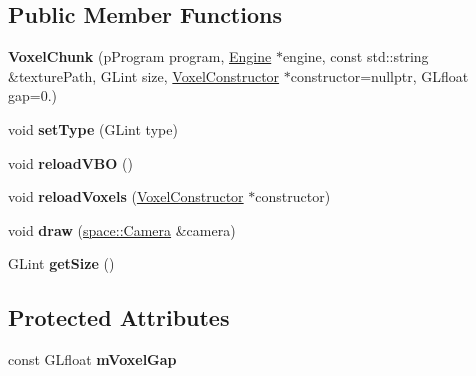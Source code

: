 \subsection*{Public Member Functions}
\begin{DoxyCompactItemize}
\item 
\hypertarget{classfillwave_1_1terrain_1_1VoxelChunk_a88e4008a5cc1f762ec84ed581928c489}{}{\bfseries Voxel\+Chunk} (p\+Program program, \hyperlink{classfillwave_1_1Engine}{Engine} $\ast$engine, const std\+::string \&texture\+Path, G\+Lint size, \hyperlink{classfillwave_1_1terrain_1_1VoxelConstructor}{Voxel\+Constructor} $\ast$constructor=nullptr, G\+Lfloat gap=0.)\label{classfillwave_1_1terrain_1_1VoxelChunk_a88e4008a5cc1f762ec84ed581928c489}

\item 
\hypertarget{classfillwave_1_1terrain_1_1VoxelChunk_a2615ea1e96bfdf19e9f5042fc051a0e8}{}void {\bfseries set\+Type} (G\+Lint type)\label{classfillwave_1_1terrain_1_1VoxelChunk_a2615ea1e96bfdf19e9f5042fc051a0e8}

\item 
\hypertarget{classfillwave_1_1terrain_1_1VoxelChunk_a9716ebfdfd4f1bbabe200e6c215c2d45}{}void {\bfseries reload\+V\+B\+O} ()\label{classfillwave_1_1terrain_1_1VoxelChunk_a9716ebfdfd4f1bbabe200e6c215c2d45}

\item 
\hypertarget{classfillwave_1_1terrain_1_1VoxelChunk_aea7cbb1776e620e04e8d593cbe56148a}{}void {\bfseries reload\+Voxels} (\hyperlink{classfillwave_1_1terrain_1_1VoxelConstructor}{Voxel\+Constructor} $\ast$constructor)\label{classfillwave_1_1terrain_1_1VoxelChunk_aea7cbb1776e620e04e8d593cbe56148a}

\item 
\hypertarget{classfillwave_1_1terrain_1_1VoxelChunk_a92f8c9c9c5fe6f19e650e8ce92ebaa49}{}void {\bfseries draw} (\hyperlink{classfillwave_1_1space_1_1Camera}{space\+::\+Camera} \&camera)\label{classfillwave_1_1terrain_1_1VoxelChunk_a92f8c9c9c5fe6f19e650e8ce92ebaa49}

\item 
\hypertarget{classfillwave_1_1terrain_1_1VoxelChunk_a6b325e15779b35f2544bc193cf7a00d5}{}G\+Lint {\bfseries get\+Size} ()\label{classfillwave_1_1terrain_1_1VoxelChunk_a6b325e15779b35f2544bc193cf7a00d5}

\end{DoxyCompactItemize}
\subsection*{Protected Attributes}
\begin{DoxyCompactItemize}
\item 
\hypertarget{classfillwave_1_1terrain_1_1VoxelChunk_a8898169971f0bcab6e3b1b2bdd8c805a}{}const G\+Lfloat {\bfseries m\+Voxel\+Gap}\label{classfillwave_1_1terrain_1_1VoxelChunk_a8898169971f0bcab6e3b1b2bdd8c805a}

\end{DoxyCompactItemize}



